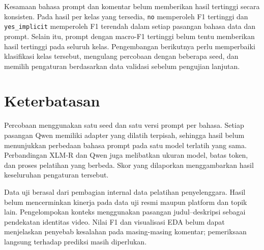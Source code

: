 \documentclass[11pt]{article}
\begin{document}
Kesamaan bahasa prompt dan komentar belum memberikan hasil tertinggi secara konsisten. Pada hasil per kelas yang tersedia, \texttt{no} memperoleh F1 tertinggi dan \texttt{yes\_implicit} memperoleh F1 terendah dalam setiap pasangan bahasa data dan prompt. Selain itu, prompt dengan macro-F1 tertinggi belum tentu memberikan hasil tertinggi pada seluruh kelas. Pengembangan berikutnya perlu memperbaiki klasifikasi kelas tersebut, mengulang percobaan dengan beberapa seed, dan memilih pengaturan berdasarkan data validasi sebelum pengujian lanjutan.

\section*{Keterbatasan}
Percobaan menggunakan satu seed dan satu versi prompt per bahasa. Setiap pasangan Qwen memiliki adapter yang dilatih terpisah, sehingga hasil belum menunjukkan perbedaan bahasa prompt pada satu model terlatih yang sama. Perbandingan XLM-R dan Qwen juga melibatkan ukuran model, batas token, dan proses pelatihan yang berbeda. Skor yang dilaporkan menggambarkan hasil keseluruhan pengaturan tersebut.

Data uji berasal dari pembagian internal data pelatihan penyelenggara. Hasil belum mencerminkan kinerja pada data uji resmi maupun platform dan topik lain. Pengelompokan konteks menggunakan pasangan judul--deskripsi sebagai pendekatan identitas video. Nilai F1 dan visualisasi EDA belum dapat menjelaskan penyebab kesalahan pada masing-masing komentar; pemeriksaan langsung terhadap prediksi masih diperlukan.


\end{document}
